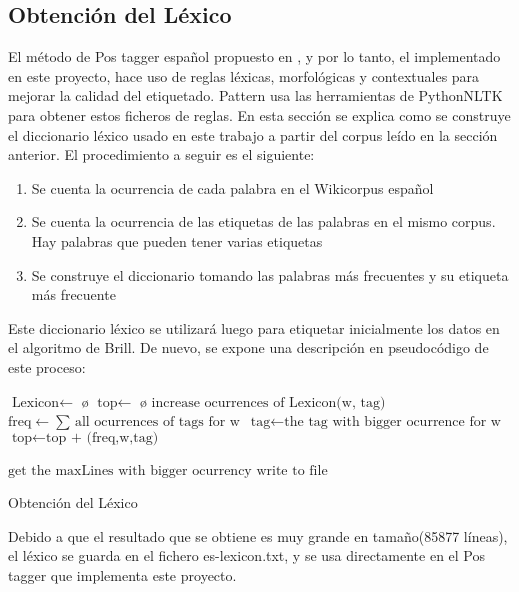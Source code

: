 \subsection{Obtención del Léxico}
El método de Pos tagger español propuesto en \citet{smedt2012pattern}, y por lo tanto, el implementado en este proyecto, hace uso de reglas léxicas, morfológicas y contextuales para mejorar la calidad del etiquetado. \textcolor{SchoolColor}{Pattern} usa las herramientas de \textcolor{SchoolColor}{PythonNLTK} para obtener estos ficheros de reglas. En esta sección se explica como se construye el diccionario léxico usado en este trabajo a partir del corpus leído en la sección anterior.\newline 
El procedimiento a seguir es el siguiente:
\begin{enumerate}
\item Se cuenta la ocurrencia de cada palabra en el Wikicorpus español
\item Se cuenta la ocurrencia de las etiquetas de las palabras en el mismo corpus. Hay palabras que pueden tener varias etiquetas
\item Se construye el diccionario tomando las palabras más frecuentes y su etiqueta más frecuente
\end{enumerate}
Este diccionario léxico se utilizará luego para etiquetar inicialmente los datos en el algoritmo de Brill. De nuevo, se expone una descripción en pseudocódigo de este proceso:
\begin{algorithm}[H]
    \begin{algorithmic}[1]
    \State $\text{Lexicon} \gets$ \o
    \State $\text{top} \gets$ \o
            \State $\text{increase ocurrences of Lexicon(w, tag)} $
            \EndFor
    \EndFor        
            \State $\text{freq} \gets \text{$\sum$ all ocurrences of tags for w}$
             \State $\text{tag} \gets \text{the tag with bigger ocurrence for w}$
             \State $\text{top} \gets \text{top + (freq,w,tag) }$
            \EndFor
            
     \State $\text{get the maxLines with bigger ocurrency}$ 
     \State $\text{write to file}$      
        \EndProcedure
    \end{algorithmic}
    \label{alg:rAP}
    \caption{Obtención del Léxico}
\end{algorithm}
Debido a que el resultado que se obtiene es muy grande en tamaño(85877 líneas), el léxico se guarda en el fichero  \textcolor{SchoolColor}{es-lexicon.txt}, y se usa directamente en el Pos tagger que implementa este proyecto.\\[\baselineskip]
